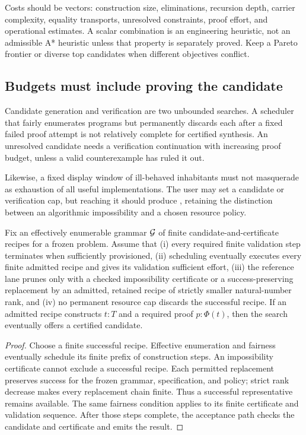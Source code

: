 Costs should be vectors: construction size, eliminations, recursion depth, carrier complexity, equality transports, unresolved constraints, proof effort, and operational estimates. A scalar combination is an engineering heuristic, not an admissible A* heuristic unless that property is separately proved. Keep a Pareto frontier or diverse top candidates when different objectives conflict.

\subsection{Budgets must include proving the candidate}

Candidate generation and verification are two unbounded searches. A scheduler that fairly enumerates programs but permanently discards each after a fixed failed proof attempt is not relatively complete for certified synthesis. An unresolved candidate needs a verification continuation with increasing proof budget, unless a valid counterexample has ruled it out.

Likewise, a fixed display window of ill-behaved inhabitants must not masquerade as exhaustion of all useful implementations. The user may set a candidate or verification cap, but reaching it should produce , retaining the distinction between an algorithmic impossibility and a chosen resource policy.

\begin{theorem}
Fix an effectively enumerable grammar $\mathcal G$ of finite candidate-and-certificate recipes for a frozen problem. Assume that (i) every required finite validation step terminates when sufficiently provisioned, (ii) scheduling eventually executes every finite admitted recipe and gives its validation sufficient effort, (iii) the reference lane prunes only with a checked impossibility certificate or a success-preserving replacement by an admitted, retained recipe of strictly smaller natural-number rank, and (iv) no permanent resource cap discards the successful recipe. If an admitted recipe constructs $t:T$ and a required proof $p:\Phi(t)$, then the search eventually offers a certified candidate.
\end{theorem}
\begin{proof}
Choose a finite successful recipe. Effective enumeration and fairness eventually schedule its finite prefix of construction steps. An impossibility certificate cannot exclude a successful recipe. Each permitted replacement preserves success for the frozen grammar, specification, and policy; strict rank decrease makes every replacement chain finite. Thus a successful representative remains available. The same fairness condition applies to its finite certificate and validation sequence. After those steps complete, the acceptance path checks the candidate and certificate and emits the result.
\end{proof}

